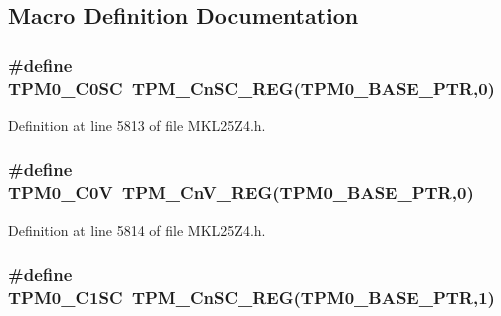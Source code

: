 \subsection{Macro Definition Documentation}
\subsubsection[{\texorpdfstring{T\+P\+M0\+\_\+\+C0\+SC}{TPM0_C0SC}}]{\setlength{\rightskip}{0pt plus 5cm}\#define T\+P\+M0\+\_\+\+C0\+SC~{\bf T\+P\+M\+\_\+\+Cn\+S\+C\+\_\+\+R\+EG}({\bf T\+P\+M0\+\_\+\+B\+A\+S\+E\+\_\+\+P\+TR},0)}\hypertarget{group___t_p_m___register___accessor___macros_gace041d2188ed4171f06ad0b573d17a16}{}\label{group___t_p_m___register___accessor___macros_gace041d2188ed4171f06ad0b573d17a16}


Definition at line 5813 of file M\+K\+L25\+Z4.\+h.

\subsubsection[{\texorpdfstring{T\+P\+M0\+\_\+\+C0V}{TPM0_C0V}}]{\setlength{\rightskip}{0pt plus 5cm}\#define T\+P\+M0\+\_\+\+C0V~{\bf T\+P\+M\+\_\+\+Cn\+V\+\_\+\+R\+EG}({\bf T\+P\+M0\+\_\+\+B\+A\+S\+E\+\_\+\+P\+TR},0)}\hypertarget{group___t_p_m___register___accessor___macros_ga6972e3980441d1fc526a72bfe4eae7bf}{}\label{group___t_p_m___register___accessor___macros_ga6972e3980441d1fc526a72bfe4eae7bf}


Definition at line 5814 of file M\+K\+L25\+Z4.\+h.

\subsubsection[{\texorpdfstring{T\+P\+M0\+\_\+\+C1\+SC}{TPM0_C1SC}}]{\setlength{\rightskip}{0pt plus 5cm}\#define T\+P\+M0\+\_\+\+C1\+SC~{\bf T\+P\+M\+\_\+\+Cn\+S\+C\+\_\+\+R\+EG}({\bf T\+P\+M0\+\_\+\+B\+A\+S\+E\+\_\+\+P\+TR},1)}\hypertarget{group___t_p_m___register___accessor___macros_gaa8f7313723db2881d7de617dbb16b4e6}{}\label{group___t_p_m___register___accessor___macros_gaa8f7313723db2881d7de617dbb16b4e6}


